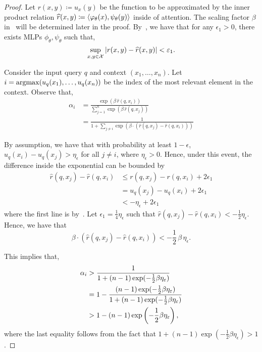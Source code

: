 \begin{proof}
    Let $r(x,y) \coloneq u_x(y)$ be the function to be approximated by the inner product relation $\widehat{r}(x,y) \coloneq \left \langle \varphi_\theta(x), \psi_\theta(y) \right\rangle$ inside of attention. The scaling factor $\beta$ in~ will be determined later in the proof. By~, we have that for any $\epsilon_1 > 0$, there exists MLPs $\phi_\theta, \psi_\theta$ such that,
    \begin{equation}\label{eq:attn_thm_proof_1}
        \sup_{x, y \in \calX} \abs{r(x,y) - \hat{r}(x, y)} < \epsilon_1.
    \end{equation}

    Consider the input query $q$ and context $(x_1, \ldots, x_n)$. Let $i = \mathop{\rm argmax}(u_q(x_1), \ldots, u_q(x_n))$ be the index of the most relevant element in the context. Observe that,
    \begin{align*}
        \alpha_i &= \frac{\exp(\beta \, \hat{r}(q, x_i))}{\sum_{j=1}^{n} \exp(\beta \, \hat{r}(q, x_j))}\\
        &= \frac{1}{1 + \sum_{j \neq i} \exp(\beta \cdot (\hat{r}(q, x_j) - \hat{r}(q, x_i)))}
    \end{align*}

    By assumption, we have that with probability at least $1 - \epsilon$, $u_q(x_i) - u_q(x_j) > \eta_{\epsilon}$ for all $j \neq i$, where $\eta_{\epsilon} > 0$. Hence, under this event, the difference inside the exponential can be bounded by
    \begin{align*}
        \hat{r}(q, x_j) - \hat{r}(q, x_i) &\leq r(q, x_j) - r(q, x_i) + 2 \epsilon_1\\
        &= u_q(x_j) - u_q(x_i) + 2 \epsilon_1 \\
        &< - \eta_{\epsilon} + 2 \epsilon_1
    \end{align*}
    where the first line is by~. Let $\epsilon_1 = \frac{1}{4}\eta_{\epsilon}$ such that $\hat{r}(q, x_j) - \hat{r}(q, x_i) < - \frac{1}{2} \eta_{\epsilon}$. Hence, we have that
    \begin{equation*}
        \beta \cdot (\hat{r}(q, x_j) - \hat{r}(q, x_i)) < - \frac{1}{2} \, \beta \, \eta_{\epsilon}.
    \end{equation*}

    This implies that,
    \begin{align*}
        \alpha_i &> \frac{1}{1 + (n-1) \exp(- \frac{1}{2} \beta \eta_{\epsilon})} \\
        &= 1 - \frac{(n-1) \exp(- \frac{1}{2} \beta \eta_{\epsilon})}{1 + (n-1) \exp(- \frac{1}{2} \beta \eta_{\epsilon})} \\
        &> 1 - (n-1) \exp\paren{- \frac{1}{2} \beta \eta_{\epsilon}},
    \end{align*}
    where the last equality follows from the fact that $1 + (n-1) \exp(- \frac{1}{2} \beta \eta_{\epsilon}) > 1$.


\end{proof}
